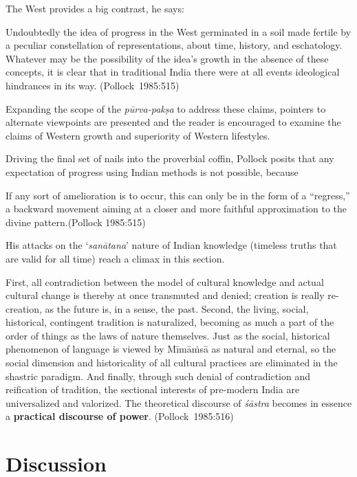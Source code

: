 The West provides a big contrast, he says: 
\begin{myquote}
Undoubtedly the idea of progress in the West germinated in a soil made fertile by a peculiar constellation of representations, about time, history, and eschatology. Whatever may be the possibility of the idea's growth in the absence of these concepts, it is clear that in traditional India there were at all events ideological hindrances in its way.	
\hfill \hbox{(Pollock 1985:515)}
\end{myquote}

Expanding the scope of the {\sl pūrva-pakṣa} to address these claims, pointers to alternate viewpoints are presented and the reader is encouraged to examine the claims of Western growth and superiority of Western lifestyles. 

Driving the final set of nails into the proverbial coffin, Pollock posits that any expectation of progress using Indian methods is not possible, because
\begin{myquote}
If any sort of amelioration is to occur, this can only be in the form of a ``regress,'' a backward movement aiming at a closer and more faithful approximation to the divine pattern.\hfill (Pollock 1985:515)
\end{myquote}

His attacks on the `{\sl sanātana}' nature of Indian knowledge (timeless truths that are valid for all time) reach a climax in this section.
\begin{myquote}
First, all contradiction between the model of cultural knowledge and actual cultural change is thereby at once transmuted and denied; creation is really re-creation, as the future is, in a sense, the past. Second, the living, social, historical, contingent tradition is naturalized, becoming as much a part of the order of things as the laws of nature themselves. Just as the social, historical phenomenon of language is viewed by Mīmāṁsā as natural and eternal, so the social dimension and historicality of all cultural practices are eliminated in the shastric paradigm. And finally, through such denial of contradiction and reification of tradition, the sectional interests of pre-modern India are universalized and valorized. The theoretical discourse of {\sl śāstra} becomes in essence a {\bf practical discourse of power}.	
\hfill \hbox{(Pollock 1985:516)}
\end{myquote}

\section*{Discussion}

